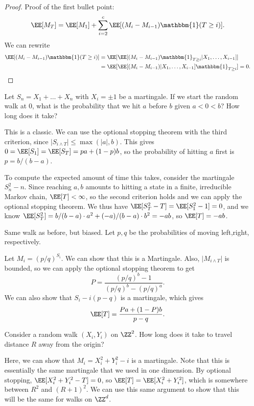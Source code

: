 \begin{proof}
Proof of the first bullet point: 
\[\EE[M_T] = \EE[M_1] + \sum_{i=2}^c \EE[(M_i-M_{i-1})\mathbbm{1}(T\geq i)].\]We can rewrite
\begin{align*}
	\EE[(M_i-M_{i-1})\mathbbm{1}(T\geq i)] &= \EE[\EE[(M_i-M_{i-1})\mathbbm{1}_{T\geq i} | X_1,\hdots, X_{i-1}]] \\
																				 &= \EE[\EE[(M_i-M_{i-1})|X_1,\hdots, X_{i-1}]\mathbbm{1}_{T\geq i}] = 0.
\end{align*}
\end{proof}

\begin{example}
\exlabel

Let $S_n=X_1+\hdots+X_n$ with $X_i=\pm 1$ be a martingale. If we start the random walk at $0$, what is the probability that we hit $a$ before $b$ given $a < 0 < b$? How long does it take? 
\end{example}

This is a classic. We can use the optional stopping theorem with the third criterion, since $\vert S_{i\wedge T}\vert \leq \max(\vert a\vert, b)$. This gives $0 = \EE[S_1] = \EE[S_T] = pa + (1-p)b$, so the probability of hitting $a$ first is $p = b / (b-a)$.  

To compute the expected amount of time this takes, consider the martingale $S_n^2 - n$. Since reaching $a,b$ amounts to hitting a state in a finite, irreducible Markov chain, $\EE[T]<\infty$, so the second criterion holds and we can apply the optional stopping theorem. We thus have $\EE[S_T^2-T] = \EE[S_1^2-1] = 0$, and we know $\EE[S_T^2] = b/(b-a)\cdot a^2 + (-a)/(b-a)\cdot b^2 = -ab$,  so $\EE[T] = -ab$. 

\begin{example}
\exlabel

Same walk as before, but biased. Let $p,q$ be the probabilities of moving left,right, respectively. 
\end{example}

Let $M_i = (p/q)^{S_i}$. We can show that this is a Martingale. Also, $\vert M_{i\wedge T}\vert$ is bounded, so we can apply the optional stopping theorem to get 
\[P = \frac{(p/q)^b - 1}{(p/q)^b - (p/q)^a}.\] 
We can also show that $S_i-i(p-q)$ is a martingale, which gives 
\[\EE[T] = \frac{Pa + (1-P)b}{p-q}.\]

\begin{example}
\exlabel

Consider a random walk $(X_i,Y_i)$ on $\ZZ^2$. How long does it take to travel distance $R$ away from the origin? 
\end{example}

Here, we can show that $M_i = X_i^2 + Y_i^2 - i$ is a martingale. Note that this is essentially the same martingale that we used in one dimension. By optional stopping, $\EE[X_i^2+Y_i^2-T] = 0$, so $\EE[T] = \EE[X_i^2+Y_i^2]$, which is somewhere between $R^2$ and $(R+1)^2$. We can use this same argument to show that this will be the same for walks on $\ZZ^d$.   

